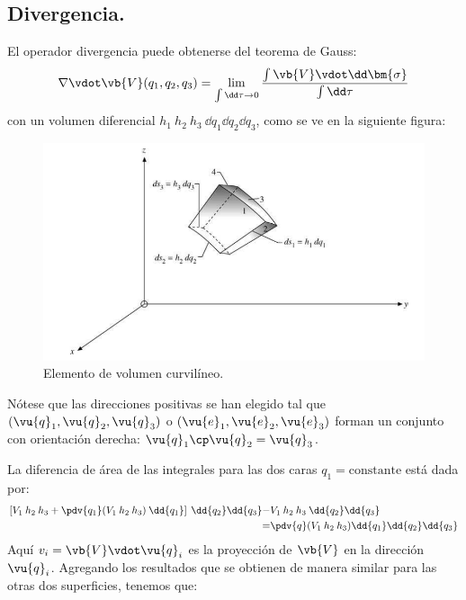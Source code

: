\subsection{Divergencia.}
El operador divergencia puede obtenerse del teorema de Gauss:
\begin{equation}
\nabla \vdot \vb{V}(q_{1}, q_{2}, q_{3}) = \lim_{\int \dd \tau \to 0} \dfrac{\int \vb{V} \vdot \dd \bm{\sigma}}{\int \dd \tau}
\label{eq:ecuacion_02_19}
\end{equation}
con un volumen diferencial $h_{1} \: h_{2} \: h_{3} \: \dd{q_{1}} \dd{q_{2}} \dd{q_{3}}$, como se ve en la siguiente figura:
\begin{figure}[H]
    \centering
    \includegraphics[scale=0.5]{Imagenes/ElementoVolumen_01.png}
    \caption{Elemento de volumen curvilíneo.}
\end{figure}
Nótese que las direcciones positivas se han elegido tal que $(\vu{q}_{1}, \vu{q}_{2}, \vu{q}_{3})$ o $(\vu{e}_{1},\vu{e}_{2}, \vu{e}_{3})$ forman un conjunto con orientación derecha: $\vu{q}_{1} \cp \vu{q}_{2} = \vu{q}_{3}$.
\par
La diferencia de área de las integrales para las dos caras $q_{1} = \text{constante}$ está dada por:
\begin{align}
\begin{aligned}
\left[ V_{1} \: h_{2} \: h_{3} + \pdv{q_{1}} (V_{1} \: h_{2} \: h_{3}) \: \dd{q_{1}} \right] \: \dd{q_{2}} \dd{q_{3}} -& V_{1} \: h_{2} \: h_{3} \: \dd{q_{2}} \dd{q_{3}} \\
=& \pdv{q} (V_{1} \: h_{2} \: h_{3}) \dd{q_{1}} \dd{q_{2}} \dd{q_{3}}
\end{aligned}
\label{eq:ecuacion_02_20}
\end{align}
Aquí  $v_{i} = \vb{V} \vdot \vu{q}_{i}$ es la proyección de $\vb{V}$ en la dirección  $\vu{q}_{i}$. Agregando los resultados que se obtienen de manera similar para las otras dos superficies, tenemos que:
